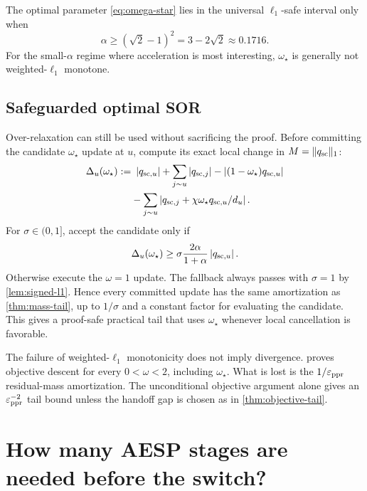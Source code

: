 The optimal parameter \cref{eq:omega-star} lies in the universal
$\ell_1$-safe interval only when
\begin{equation}
  \alpha\geq(\sqrt2-1)^2=3-2\sqrt2\approx0.1716.
  \label{eq:omega-safe-alpha}
\end{equation}
For the small-$\alpha$ regime where acceleration is most interesting,
$\omega_\star$ is generally not weighted-$\ell_1$ monotone.

\subsection{Safeguarded optimal SOR}

Over-relaxation can still be used without sacrificing the proof.  Before
committing the candidate $\omega_\star$ update at $u$, compute its exact local
change in $M=\lVert q_{\rm sc}\rVert_1$:
\begin{align}
  \Delta_u(\omega_\star)
  :=&\ \left\lvert q_{{\rm sc},u} \right\rvert+\sum_{j\sim u}\left\lvert q_{{\rm sc},j} \right\rvert
  -\left\lvert (1-\omega_\star)q_{{\rm sc},u} \right\rvert
  \nonumber\\
  &-\sum_{j\sim u}
     \left\lvert q_{{\rm sc},j}
          +\chi\omega_\star q_{{\rm sc},u}/d_u \right\rvert.
  \label{eq:exact-local-mass-change}
\end{align}
For $\sigma\in(0,1]$, accept the candidate only if
\begin{equation}
  \Delta_u(\omega_\star)
  \geq
  \sigma\frac{2\alpha}{1+\alpha}\left\lvert q_{{\rm sc},u} \right\rvert.
  \label{eq:safeguard-test}
\end{equation}
Otherwise execute the $\omega=1$ update.  The fallback always passes with
$\sigma=1$ by \cref{lem:signed-l1}.  Hence every committed update has the
same amortization as \cref{thm:mass-tail}, up to $1/\sigma$ and a constant
factor for evaluating the candidate.  This gives a proof-safe practical tail
that uses $\omega_\star$ whenever local cancellation is favorable.

\begin{remark}
The failure of weighted-$\ell_1$ monotonicity does not imply divergence.
 proves objective descent for every
$0<\omega<2$, including $\omega_\star$.  What is lost is the
$1/\varepsilon_{\mathrm{ppr}}$ residual-mass amortization.  The unconditional objective argument
alone gives an $\varepsilon_{\mathrm{ppr}}^{-2}$ tail bound unless the handoff gap is chosen as in
\cref{thm:objective-tail}.
\end{remark}

\section{How many AESP stages are needed before the switch?}
\label{sec:burnin-stages}


